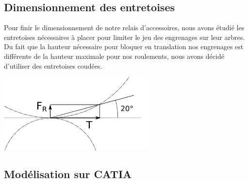\documentclass{config}
\begin{document}
\begin{spacing}{1.2}
\begin{table}[]
\centering
{}
\end{table}



\newpage
\subsection{Dimensionnement des entretoises}

Pour finir le dimensionnement de notre relais d'accessoires, nous avons étudié les entretoises nécessaires à placer pour limiter le jeu des engrenages sur leur arbres. Du fait que la hauteur nécessaire pour bloquer en translation nos engrenages est différente de la hauteur maximale pour nos roulements, nous avons décidé d'utiliser des entretoises coudées.

\begin{center}
\includegraphics[width=0.6\textwidth]{Droite_de_pression.png}
\end{center}

\newpage
\subsection{Modélisation sur CATIA}


\end{spacing}
\end{document}
